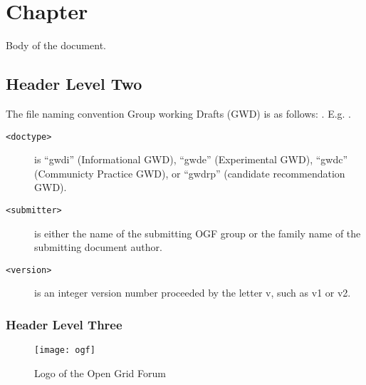 
\section{Chapter}
\label{s:the_juicy_stuff}

Body of the document.

\subsection{Header Level Two}

The file naming convention Group working Drafts (GWD) is as follows:
.
E.g. .
\begin{description}
\item[\texttt{<doctype>}] is ``gwdi'' (Informational GWD), ``gwde'' (Experimental GWD), ``gwdc'' (Communicty Practice GWD), or ``gwdrp'' (candidate recommendation GWD).
\item[\texttt{<submitter>}] is either the name of the submitting OGF group or the family name of the submitting document author.
\item[\texttt{<version>}] is an integer version number proceeded by the letter v, such as v1 or v2.
\end{description}

\subsubsection{Header Level Three}

\begin{figure}[ht]
    \centering
    \texttt{[image: ogf]}
    \caption{Logo of the Open Grid Forum}
    \label{fig:ogf-logo}
\end{figure}

